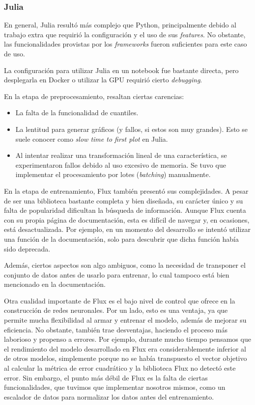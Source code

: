 \documentclass[11pt]{article}
\let\Oldsubsubsection\subsubsection
\renewcommand{\subsubsection}{\FloatBarrier\Oldsubsubsection}
\newcommand{\english}[1]{\textit{#1}}
\begin{document}
\subsubsection{Julia}

En general, Julia resultó más complejo que Python, principalmente debido al trabajo extra que requirió la configuración y el uso de sus \english{features}. No obstante, las funcionalidades provistas por los \english{frameworks} fueron suficientes para este caso de uso.

La configuración para utilizar Julia en un notebook fue bastante directa, pero desplegarla en Docker o utilizar la GPU requirió cierto \english{debugging}.

En la etapa de preprocesamiento, resaltan ciertas carencias:

\begin{itemize}
    \item La falta de la funcionalidad de cuantiles.
    \item La lentitud para generar gráficos (y fallos, si estos son muy grandes). Esto se suele conocer como \english{slow time to first plot} \cite{jl:ex:slow_time_first_plot} en Julia.
    \item Al intentar realizar una transformación lineal de una característica, se experimentaron fallos debido al uso excesivo de memoria. Se tuvo que implementar el procesamiento por lotes (\english{batching}) manualmente.
\end{itemize}

En la etapa de entrenamiento, Flux también presentó sus complejidades. A pesar de ser una biblioteca bastante completa y bien diseñada, su carácter único y su falta de popularidad dificultan la búsqueda de información. Aunque Flux cuenta con su propia página de documentación, esta es difícil de navegar y, en ocasiones, está desactualizada. Por ejemplo, en un momento del desarrollo se intentó utilizar una función de la documentación, solo para descubrir que dicha función había sido deprecada.

Además, ciertos aspectos son algo ambiguos, como la necesidad de transponer el conjunto de datos antes de usarlo para entrenar, lo cual tampoco está bien mencionado en la documentación.

Otra cualidad importante de Flux es el bajo nivel de control que ofrece en la construcción de redes neuronales. Por un lado, esto es una ventaja, ya que permite mucha flexibilidad al armar y entrenar el modelo, además de mejorar su eficiencia. No obstante, también trae desventajas, haciendo el proceso más laborioso y propenso a errores. Por ejemplo, durante mucho tiempo pensamos que el rendimiento del modelo desarrollado en Flux era considerablemente inferior al de otros modelos, simplemente porque no se había transpuesto el vector objetivo al calcular la métrica de error cuadrático y la biblioteca Flux no detectó este error. Sin embargo, el punto más débil de Flux es la falta de ciertas funcionalidades, que tuvimos que implementar nosotros mismos, como un escalador de datos para normalizar los datos antes del entrenamiento.
\end{document}
